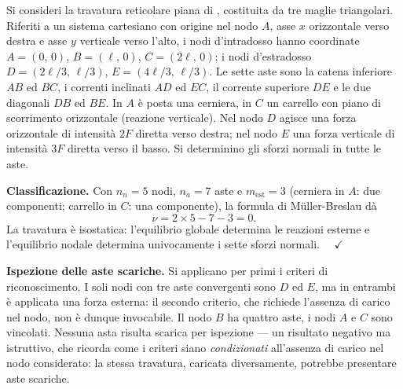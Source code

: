 \begin{esercizio}
	\label{ex:tre_maglie}
	
	Si consideri la travatura reticolare piana di
	, costituita da
	tre maglie triangolari. Riferiti a un sistema cartesiano
	con origine nel nodo $A$, asse $x$ orizzontale verso
	destra e asse $y$ verticale verso l'alto, i nodi
	d'intradosso hanno
	coordinate $A=(0,\,0)$, $B=(\ell,\,0)$,
	$C=(2\ell,\,0)$; i nodi d'estradosso
	$D=(2\ell/3,\,\ell/3)$, $E=(4\ell/3,\,\ell/3)$.
	Le sette aste sono la catena inferiore $AB$ ed $BC$,
	i correnti inclinati $AD$ ed $EC$, il corrente
	superiore $DE$ e le due diagonali $DB$ ed $BE$.
	In $A$ è posta una cerniera, in $C$ un carrello con
	piano di scorrimento orizzontale (reazione verticale).
	Nel nodo $D$ agisce una forza orizzontale di intensità
	$2F$ diretta verso destra; nel nodo $E$ una forza
	verticale di intensità $3F$ diretta verso il basso.
	Si determinino gli sforzi normali in tutte le aste.
	
	
	\begin{svolgimento}
		



		
		\noindent\textbf{Classificazione.}
		Con $n_n = 5$ nodi, $n_a = 7$ aste e
		$m_\text{est} = 3$ (cerniera in $A$: due componenti;
		carrello in $C$: una componente), la formula di
		M\"{u}ller-Breslau dà
		\[
		\nu = 2\times 5 - 7 - 3 = 0.
		\]
		La travatura è isostatica: l'equilibrio globale
		determina le reazioni esterne e l'equilibrio nodale
		determina univocamente i sette sforzi normali.
		$\quad\checkmark$
		
		\noindent\textbf{Ispezione delle aste scariche.}
		Si applicano per primi i criteri di riconoscimento.
		I soli nodi con tre aste convergenti sono $D$ ed $E$,
		ma in entrambi è applicata una forza esterna: il
		secondo criterio, che richiede l'assenza di carico
		nel nodo, non è dunque invocabile. Il nodo $B$ ha
		quattro aste, i nodi $A$ e $C$ sono vincolati.
		Nessuna asta risulta scarica per ispezione --- un
		risultato negativo ma istruttivo, che ricorda come
		i criteri siano \emph{condizionati} all'assenza di
		carico nel nodo considerato: la stessa travatura,
		caricata diversamente, potrebbe presentare aste
		scariche.
		

\end{svolgimento}
\end{esercizio}
